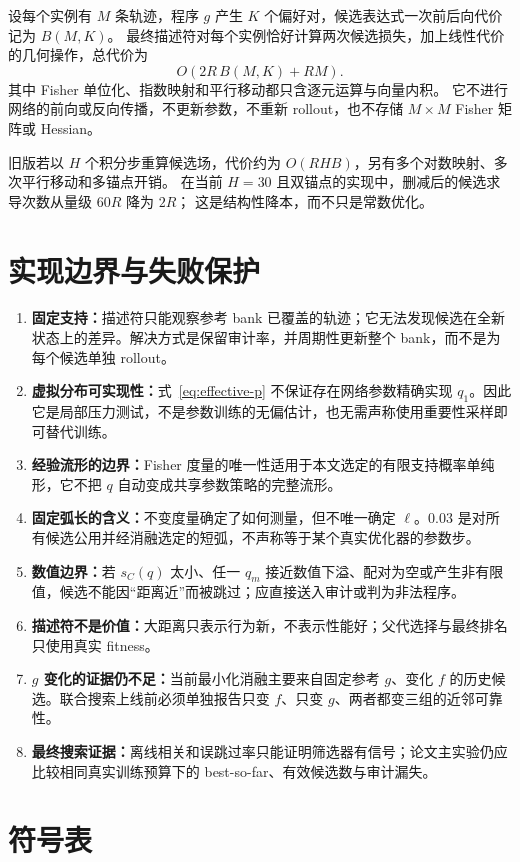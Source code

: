 \documentclass[UTF8,11pt]{ctexart}
\begin{document}
设每个实例有 $M$ 条轨迹，程序 $g$ 产生 $K$ 个偏好对，候选表达式一次前后向代价记为 $B(M,K)$。
最终描述符对每个实例恰好计算两次候选损失，加上线性代价的几何操作，总代价为
\[
O\!\left(2R\,B(M,K)+RM\right).
\]
其中 Fisher 单位化、指数映射和平行移动都只含逐元运算与向量内积。
它不进行网络的前向或反向传播，不更新参数，不重新 rollout，也不存储 $M\times M$ Fisher 矩阵或 Hessian。

旧版若以 $H$ 个积分步重算候选场，代价约为 $O(RH B)$，另有多个对数映射、多次平行移动和多锚点开销。
在当前 $H=30$ 且双锚点的实现中，删减后的候选求导次数从量级 $60R$ 降为 $2R$；
这是结构性降本，而不只是常数优化。

\section{实现边界与失败保护}

\begin{enumerate}
  \item \textbf{固定支持：}描述符只能观察参考 bank 已覆盖的轨迹；它无法发现候选在全新状态上的差异。解决方式是保留审计率，并周期性更新整个 bank，而不是为每个候选单独 rollout。
  \item \textbf{虚拟分布可实现性：}式~\eqref{eq:effective-p} 不保证存在网络参数精确实现 $q_1$。因此它是局部压力测试，不是参数训练的无偏估计，也无需声称使用重要性采样即可替代训练。
  \item \textbf{经验流形的边界：}Fisher 度量的唯一性适用于本文选定的有限支持概率单纯形，它不把 $q$ 自动变成共享参数策略的完整流形。
  \item \textbf{固定弧长的含义：}不变度量确定了如何测量，但不唯一确定 $\ell$。$0.03$ 是对所有候选公用并经消融选定的短弧，不声称等于某个真实优化器的参数步。
  \item \textbf{数值边界：}若 $s_C(q)$ 太小、任一 $q_m$ 接近数值下溢、配对为空或产生非有限值，候选不能因“距离近”而被跳过；应直接送入审计或判为非法程序。
  \item \textbf{描述符不是价值：}大距离只表示行为新，不表示性能好；父代选择与最终排名只使用真实 fitness。
  \item \textbf{$g$ 变化的证据仍不足：}当前最小化消融主要来自固定参考 $g$、变化 $f$ 的历史候选。联合搜索上线前必须单独报告只变 $f$、只变 $g$、两者都变三组的近邻可靠性。
  \item \textbf{最终搜索证据：}离线相关和误跳过率只能证明筛选器有信号；论文主实验仍应比较相同真实训练预算下的 best-so-far、有效候选数与审计漏失。
\end{enumerate}

\section{符号表}
\end{document}
